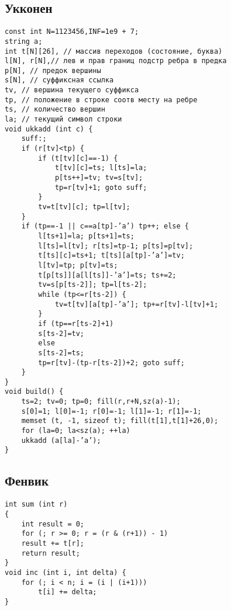 \documentclass[14pt,fleqn]{article}
\begin{document}
\begin{multicols*}{2}
\subsection{Укконен}
\begin{Verbatim}[tabsize=4]
const int N=1123456,INF=1e9 + 7;
string a;
int t[N][26], // массив переходов (состояние, буква)
l[N], r[N],// лев и прав границ подстр ребра в предка
p[N], // предок вершины
s[N], // суффиксная ссылка
tv, // вершина текущего суффикса
tp, // положение в строке соотв месту на ребре
ts, // количество вершин
la; // текущий символ строки
void ukkadd (int c) {
	suff:;
	if (r[tv]<tp) {
		if (t[tv][c]==-1) {
			t[tv][c]=ts; l[ts]=la;
			p[ts++]=tv; tv=s[tv];
			tp=r[tv]+1; goto suff;
		}
		tv=t[tv][c]; tp=l[tv];
	}
	if (tp==-1 || c==a[tp]-’a’) tp++; else {
		l[ts+1]=la; p[ts+1]=ts;
		l[ts]=l[tv]; r[ts]=tp-1; p[ts]=p[tv];
		t[ts][c]=ts+1; t[ts][a[tp]-’a’]=tv;
		l[tv]=tp; p[tv]=ts;
		t[p[ts]][a[l[ts]]-’a’]=ts; ts+=2;
		tv=s[p[ts-2]]; tp=l[ts-2];
		while (tp<=r[ts-2]) {
			tv=t[tv][a[tp]-’a’]; tp+=r[tv]-l[tv]+1;
		}
		if (tp==r[ts-2]+1)
		s[ts-2]=tv;
		else
		s[ts-2]=ts;
		tp=r[tv]-(tp-r[ts-2])+2; goto suff;
	}
}
void build() {
	ts=2; tv=0; tp=0; fill(r,r+N,sz(a)-1);
	s[0]=1; l[0]=-1; r[0]=-1; l[1]=-1; r[1]=-1;
	memset (t, -1, sizeof t); fill(t[1],t[1]+26,0);
	for (la=0; la<sz(a); ++la)
	ukkadd (a[la]-’a’);
}

\end{Verbatim}
\subsection{Фенвик}
\begin{Verbatim}[tabsize=4]
int sum (int r)
{
	int result = 0;
	for (; r >= 0; r = (r & (r+1)) - 1)
	result += t[r];
	return result;
}
void inc (int i, int delta) {
    for (; i < n; i = (i | (i+1)))
		t[i] += delta;
}
\end{Verbatim}

\end{multicols*}
\end{document}
